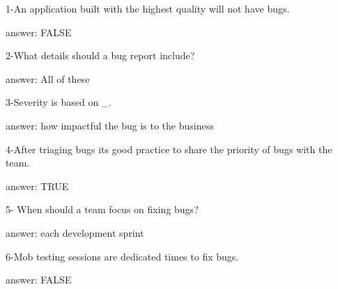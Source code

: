 1-An application built with the highest quality will not have bugs.

answer: FALSE

2-What details should a bug report include?

answer: All of these

3-Severity is based on _.

answer: how impactful the bug is to the business

4-After triaging bugs its good practice to share the priority of bugs with the team.

answer: TRUE

5- When should a team focus on fixing bugs?

answer: each development sprint

6-Mob testing sessions are dedicated times to fix bugs.

answer: FALSE
